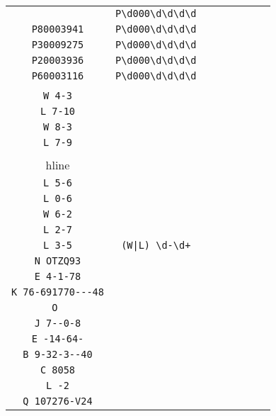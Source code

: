 \begin{longtable}{cccccccc}
\begin{tabular}{ll}
    \verb|P50003155| & \verb|P\d000\d\d\d\d|\\
\verb|P80003941| & \verb|P\d000\d\d\d\d|\\
\verb|P30009275| & \verb|P\d000\d\d\d\d|\\
\verb|P20003936| & \verb|P\d000\d\d\d\d|\\
\verb|P60003116| & \verb|P\d000\d\d\d\d|
\end{tabular}
\\\midrule 
\begin{tabular}{l}
    \verb|W 4-2|\\
\verb|W 4-3|\\
\verb|L 7-10|\\
\verb|W 8-3|\\
\verb|L 7-9|\\
\\hline\\
\verb|L 5-6|\\
\verb|L 0-6|\\
\verb|W 6-2|\\
\verb|L 2-7|\\
\verb|L 3-5|
\end{tabular}

&
\verb.(W|L) \d-\d+.
&

\begin{tabular}{l}
    \verb|\u ((\d)*-)*(\u)*(\d)*|\\
\verb|N OTZQ93|\\
\verb|E 4-1-78|\\
\verb|K 76-691770---48|\\
\verb|O |\\
\verb|J 7--0-8|
\end{tabular}

&

\begin{tabular}{l}
    \verb|\u ((\d)*-)*(\u)*(\d)*|\\
\verb|E -14-64-|\\
\verb|B 9-32-3--40|\\
\verb|C 8058|\\
\verb|L -2|\\
\verb|Q 107276-V24|
\end{tabular}

&


\end{longtable}
